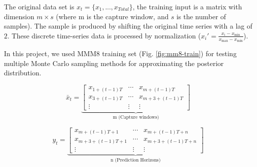\documentclass{article}
\begin{document}
The original data set is $x_t = \{x_{1}, ..., x_{Total}\}$, the training input is a matrix with dimension $m \times s$ (where m is the capture window, and $s$ is the number of samples). The sample is produced by shifting the original time series with a lag of $2$.  These discrete time-series data is processed by normalization ($x_{i}' = \frac{x_{i} - x_{\min}}{x_{\max} - x_{\min}}$). 

In this project, we used \textsc{MMM8} training set (Fig. \ref{fig:mm8-train}) for testing multiple Monte Carlo sampling methods for approximating the posterior distribution.

\begin{equation}
\bar{x}_t = 
\underbrace{\begin{bmatrix}
    x_{1+(t-1)T} & \cdots & x_{m+(t-1)T}\\
    x_{3+(t-1)T} & \cdots & x_{m+3+(t-1)T}\\
    \vdots & \vdots & \vdots 
\end{bmatrix}}_{\text{m (Capture windows)}}
\label{eq:window}
\end{equation}

\begin{equation}
y_t = 
\underbrace{\begin{bmatrix}
    x_{m+(t-1)T + 1} & \cdots & x_{m+(t-1)T+ n}\\
    x_{m+3+(t-1)T + 1} & \cdots & x_{m+3+(t-1)T+ n}\\
    \vdots & \vdots & \vdots
\end{bmatrix}}_{\text{n (Prediction Horizons)}}
\label{eq:ywindow}
\end{equation}
\end{document}
